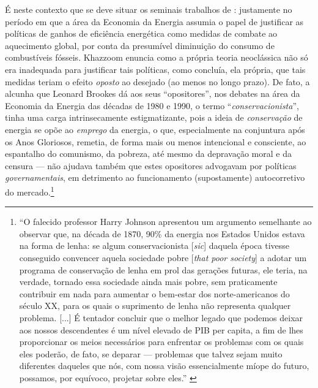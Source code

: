 É neste contexto que se deve situar os seminais trabalhos de \textcite{Khazzoom1980,Khazzoom1987}: justamente no período em que a área da Economia da Energia assumia o papel de justificar as políticas de ganhos de eficiência energética como medidas de combate ao aquecimento global, por conta da presumível diminuição do consumo de combustíveis fósseis. Khazzoom enuncia como a própria teoria neoclássica não só era inadequada para justificar tais políticas, como concluía, ela própria, que tais medidas teriam o efeito \textit{oposto} ao desejado (ao menos no longo prazo). De fato, a alcunha que Leonard Brookes dá aos seus ``opositores'', nos debates na área da Economia da Energia das décadas de 1980 e 1990, o termo ``\textit{conservacionista}'', tinha uma carga intrinsecamente estigmatizante, pois a ideia de \textit{conservação} de energia se opõe ao \textit{emprego} da energia, o que, especialmente na conjuntura após os Anos Gloriosos, remetia, de forma mais ou menos intencional e consciente, ao espantalho do comunismo, da pobreza, até mesmo da depravação moral e da censura --- não ajudava também que estes opositores advogavam por políticas \textit{governamentais}, em detrimento ao funcionamento (supostamente) autocorretivo do mercado.\footnote{``O falecido professor Harry Johnson apresentou um argumento semelhante ao observar que, na década de 1870, 90\% da energia nos Estados Unidos estava na forma de lenha: se algum conservacionista [\textit{sic}] daquela época tivesse conseguido convencer aquela sociedade pobre [\textit{that poor society}] a adotar um programa de conservação de lenha em prol das gerações futuras, ele teria, na verdade, tornado essa sociedade ainda mais pobre, sem praticamente contribuir em nada para aumentar o bem-estar dos norte-americanos do século XX, para os quais o suprimento de lenha não representa qualquer problema. [...] É tentador concluir que o melhor legado que podemos deixar aos nossos descendentes é um nível elevado de PIB per capita, a fim de lhes proporcionar os meios necessários para enfrentar os problemas com os quais eles poderão, de fato, se deparar --- problemas que talvez sejam muito diferentes daqueles que nós, com nossa visão essencialmente míope do futuro, possamos, por equívoco, projetar sobre eles.'' \parencite[p. 319]{Brookes1990}}


